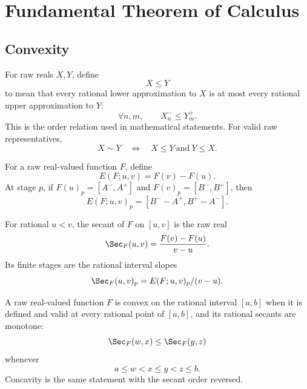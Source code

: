 \chapter{Fundamental Theorem of Calculus}

\section{Convexity}

\begin{definition}\label{def:raw-real-order}
\leanok
For raw reals \(X,Y\), define
\[
  X\le Y
\]
to mean that every rational lower approximation to \(X\) is at most every
rational upper approximation to \(Y\):
\[
  \forall n,m,\qquad X_n^- \le Y_m^+.
\]
This is the order relation used in mathematical statements.  For valid raw
representatives,
\[
  X\sim Y
  \quad\Longleftrightarrow\quad
  X\le Y\ \text{and}\ Y\le X.
\]
\end{definition}

\begin{definition}\label{def:endpoint-diff}
For a raw real-valued function \(F\), define
\[
  E(F;u,v)=F(v)-F(u).
\]
At stage \(p\), if \(F(u)_p=[A^-,A^+]\) and
\(F(v)_p=[B^-,B^+]\), then
\[
  E(F;u,v)_p=[B^- - A^+,B^+ - A^-].
\]
\end{definition}

\begin{definition}\label{def:rational-secant}
\leanok
For rational \(u<v\), the secant of \(F\) on \([u,v]\) is the raw real
\[
  \Sec_F(u,v)=\frac{F(v)-F(u)}{v-u}.
\]
Its finite stages are the rational interval slopes
\[
  \Sec_F(u,v)_p=E(F;u,v)_p/(v-u).
\]
\end{definition}

\begin{definition}[Convexity]\label{def:exact-convexity}
\leanok
A raw real-valued function \(F\) is convex on the rational interval
\([a,b]\) when it is defined and valid at every rational point of
\([a,b]\), and its rational secants are monotone:
\[
  \Sec_F(w,x)\le \Sec_F(y,z)
\]
whenever
\[
  a\le w<x\le y<z\le b.
\]
Concavity is the same statement with the secant order reversed.
\end{definition}

